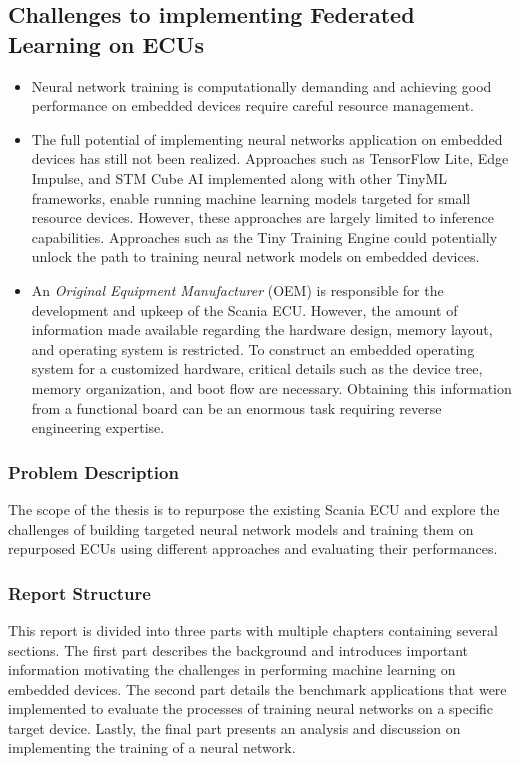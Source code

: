 \subsection*{Challenges to implementing Federated Learning on ECUs}

\begin{itemize}
	\item Neural network training is computationally demanding and achieving good performance on embedded devices require careful resource management.
	\item The full potential of implementing neural networks application on embedded devices has still not been realized. Approaches such as TensorFlow Lite, Edge Impulse, and STM Cube AI implemented along with other TinyML frameworks, enable running machine learning models targeted for small resource devices. However, these approaches are largely limited to inference capabilities. Approaches such as the Tiny Training Engine could potentially unlock the path to training neural network models on embedded devices.
	\item An \textit{Original Equipment Manufacturer} (OEM) is responsible for the development and upkeep of the Scania ECU. However, the amount of information made available regarding the hardware design, memory layout, and operating system is restricted. To construct an embedded operating system for a customized hardware, critical details such as the device tree, memory organization, and boot flow are necessary. Obtaining this information from a functional board can be an enormous task requiring reverse engineering expertise.
\end{itemize}

\subsubsection{Problem Description}


The scope of the thesis is to repurpose the existing Scania ECU and explore the challenges of building targeted neural network models and training them on repurposed ECUs using different approaches and evaluating their performances.

\subsubsection{Report Structure}

This report is divided into three parts with multiple chapters containing several sections. The first part describes the background and introduces important information motivating the challenges in performing machine learning on embedded devices. The second part details the benchmark applications that were implemented to evaluate the processes of training neural networks on a specific target device. Lastly, the final part presents an analysis and discussion on implementing the training of a neural network.

